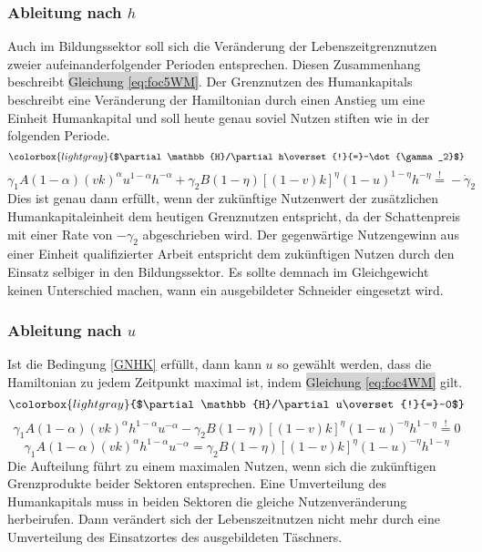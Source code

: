 \subsubsection*{Ableitung nach $h$}
Auch im Bildungssektor soll sich die Veränderung der Lebenszeitgrenznutzen zweier aufeinanderfolgender Perioden entsprechen. Diesen Zusammenhang beschreibt \colorbox{lightgray}{Gleichung \eqref{eq:foc5WM}}. Der Grenznutzen des Humankapitals beschreibt eine Veränderung der Hamiltonian durch einen Anstieg um eine Einheit Humankapital und soll heute genau soviel Nutzen stiften wie in der folgenden Periode.
\begin{equation}
\colorbox{lightgray}{$\partial\mathbb{H}/\partial h\overset{!}{=}-\dot{\gamma_2}$}\label{nachH}
\end{equation}
\begin{equation}
\gamma_1A(1-\alpha)(vk)^\alpha u^{1-\alpha}h^{-\alpha}+\gamma_2 B(1-\eta)[(1-v)k]^{\eta}(1-u)^{1-\eta}h^{-\eta}\overset{!}{=}-\dot{\gamma}_2\label{GNHK}
\end{equation}
Dies ist genau dann erfüllt, wenn der zukünftige Nutzenwert der zusätzlichen Humankapitaleinheit dem heutigen Grenznutzen entspricht, da der Schattenpreis mit einer Rate von $-\gamma_2$ abgeschrieben wird. Der gegenwärtige Nutzengewinn aus einer Einheit qualifizierter Arbeit entspricht dem zukünftigen Nutzen durch den Einsatz selbiger in den Bildungssektor. Es sollte demnach im Gleichgewicht keinen Unterschied machen, wann ein ausgebildeter Schneider eingesetzt wird. 

\subsubsection*{Ableitung nach $u$}
Ist die Bedingung \eqref{GNHK} erfüllt, dann kann $u$ so gewählt werden, dass die Hamiltonian zu jedem Zeitpunkt maximal ist, indem \colorbox{lightgray}{Gleichung \eqref{eq:foc4WM}} gilt.
\begin{equation}
\colorbox{lightgray}{$\partial\mathbb{H}/\partial u\overset{!}{=}~0$}
\end{equation}
\vspace{-0.5cm}
\begin{equation}
\gamma_1A(1-\alpha)(vk)^{\alpha}h^{1-\alpha}u^{-\alpha}-\gamma_2B(1-\eta)[(1-v)k]^\eta (1-u)^{-\eta} h^{1-\eta}\overset{!}{=}0
\end{equation}
\vspace{-0.7cm}
\begin{equation}
\gamma_1A(1-\alpha)(vk)^{\alpha}h^{1-\alpha}u^{-\alpha}=\gamma_2B(1-\eta)[(1-v)k]^\eta (1-u)^{-\eta} h^{1-\eta}\label{foc4}
\end{equation}
Die Aufteilung führt zu einem maximalen Nutzen, wenn sich die zukünftigen Grenzprodukte beider Sektoren entsprechen. Eine Umverteilung des Humankapitals muss in beiden Sektoren die gleiche Nutzenveränderung herbeirufen. Dann verändert sich der Lebenszeitnutzen nicht mehr durch eine Umverteilung des Einsatzortes des ausgebildeten Täschners.

